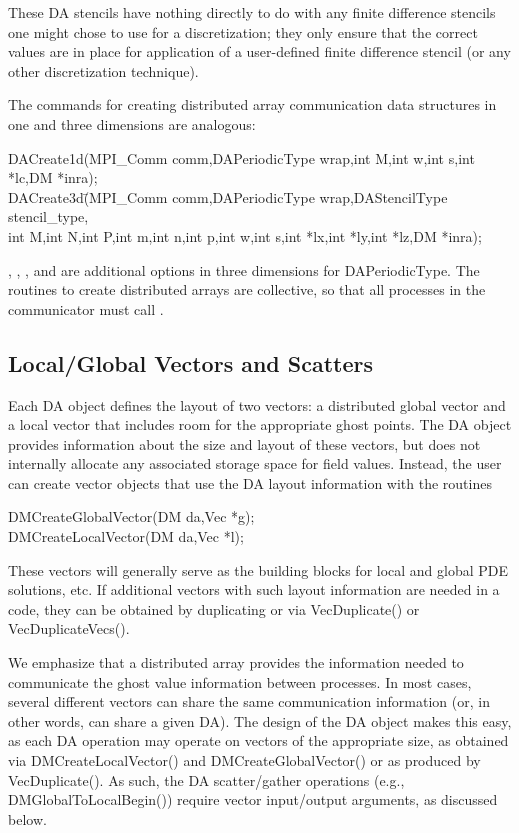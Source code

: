 These DA stencils have nothing directly to do with any finite
difference stencils one might chose to use for a discretization; they
only ensure that the correct values are in place for application of a
user-defined finite difference stencil (or any other
discretization technique).

The commands for creating distributed array communication data structures
in one and three dimensions are analogous:
\begin{tabbing}
  DACreate1d(MPI\_Comm comm,DAPeriodicType wrap,int M,int w,int s,int *lc,DM *inra);\\
  DACreate3d\=(MPI\_Comm comm,DAPeriodicType wrap,DAStencilType stencil\_type,\\
             \>int M,int N,int P,int m,int n,int p,int w,int s,int *lx,int *ly,int *lz,DM *inra);
\end{tabbing}
, 
, 
, and 
 
are additional options in three dimensions for DAPeriodicType.
The routines to create distributed arrays are collective, so that all
processes in the communicator  must call .

\subsection{Local/Global Vectors and Scatters}

Each DA object defines the layout of two vectors: a distributed
global vector and a local vector that includes room for the
appropriate ghost points.  The DA object provides information
about the size and layout of these vectors, but does not internally
allocate any associated storage space for field values.  Instead, the
user can create vector objects that use the DA layout
information with the routines
\begin{tabbing}
  DMCreateGlobalVector(DM da,Vec *g);\\
  DMCreateLocalVector(DM da,Vec *l);
\end{tabbing}
These vectors will generally serve as the building blocks for local
and global PDE solutions, etc.  If additional vectors with such
layout information are needed in a code, they can be obtained by
duplicating  or  via
VecDuplicate() or VecDuplicateVecs().

We emphasize that a distributed array provides the information needed
to communicate the ghost value information between processes.  In most
cases, several different vectors can share the same communication
information (or, in other words, can share a given DA).  The
design of the DA object makes this easy, as each DA
operation may operate on vectors of the appropriate size, as obtained
via DMCreateLocalVector() and DMCreateGlobalVector() or as
produced by VecDuplicate().  As such, the DA
scatter/gather operations (e.g., DMGlobalToLocalBegin()) require
vector input/output arguments, as discussed below.

